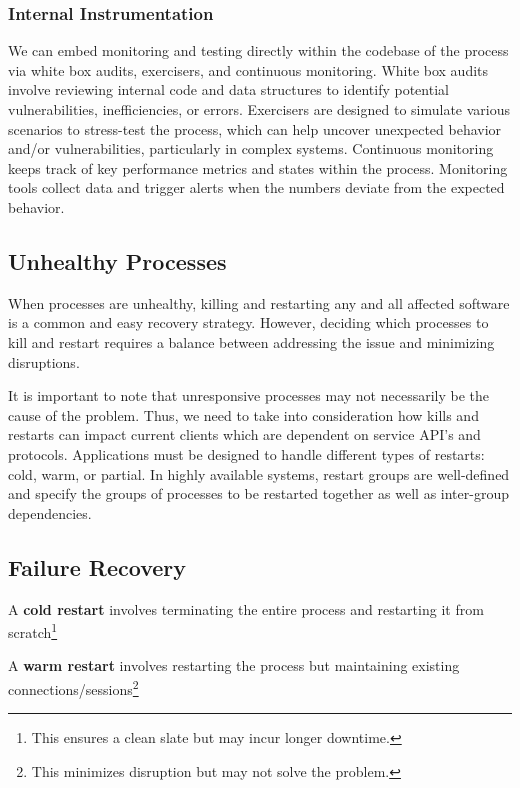 \documentclass{report}
\newcommand{\definitionBegin}[1]{\begin{tcolorbox}[title={Definition: #1}]}
\newcommand{\definitionEnd}{\end{tcolorbox}}
\begin{document}
\subsubsection{Internal Instrumentation}
We can embed monitoring and testing directly within the codebase of the process via white box
audits, exercisers, and continuous monitoring. White box audits involve reviewing internal code and
data structures to identify potential vulnerabilities, inefficiencies, or errors. Exercisers are
designed to simulate various scenarios to stress-test the process, which can help uncover unexpected
behavior and/or vulnerabilities, particularly in complex systems. Continuous monitoring keeps track
of key performance metrics and states within the process. Monitoring tools collect data and trigger
alerts when the numbers deviate from the expected behavior.


\subsection{Unhealthy Processes}
When processes are unhealthy, killing and restarting any and all affected software is a common and
easy recovery strategy. However, deciding which processes to kill and restart requires a balance
between addressing the issue and minimizing disruptions.

It is important to note that unresponsive processes may not necessarily be the cause of the
problem. Thus, we need to take into consideration how kills and restarts can impact current clients
which are dependent on service API's and protocols. Applications must be designed to handle
different types of restarts: cold, warm, or partial. In highly available systems, restart groups are
well-defined and specify the groups of processes to be restarted together as well as inter-group
dependencies.


\subsection{Failure Recovery}
\definitionBegin{Cold Restart}
A \textbf{cold restart} involves terminating the entire process and restarting it from
scratch\footnote{This ensures a clean slate but may incur longer downtime.}
\definitionEnd

\definitionBegin{Warm Restart}
A \textbf{warm restart} involves restarting the process but maintaining existing
connections/sessions\footnote{This minimizes disruption but may not solve the problem.} 
\definitionEnd
\end{document}
